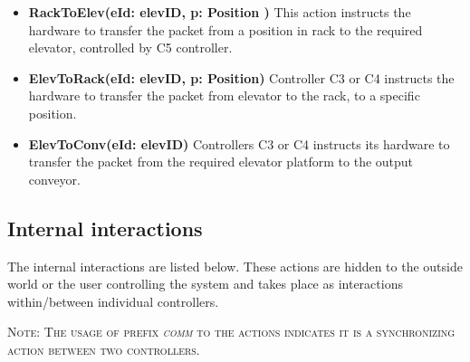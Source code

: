 \begin{itemize}
\item \textbf{RackToElev(eId: elevID, p: Position )}
This action instructs the hardware to transfer the packet from a position in rack to the required elevator, controlled by C5 controller.

\item \textbf{ElevToRack(eId: elevID, p: Position)}
Controller C3 or C4 instructs the hardware to transfer the packet from elevator to the rack, to a specific position.

\item \textbf{ElevToConv(eId: elevID)}
Controllers C3 or C4 instructs its hardware to transfer the packet from the required elevator platform to the output conveyor.

\end{itemize}

\subsection*{Internal interactions}
The internal interactions are listed below. These actions are hidden to the outside world or the user controlling the system and takes place as interactions within/between individual controllers.

\textsc{Note: The usage of prefix \textit{comm} to the actions indicates it is a synchronizing action between two controllers.}


